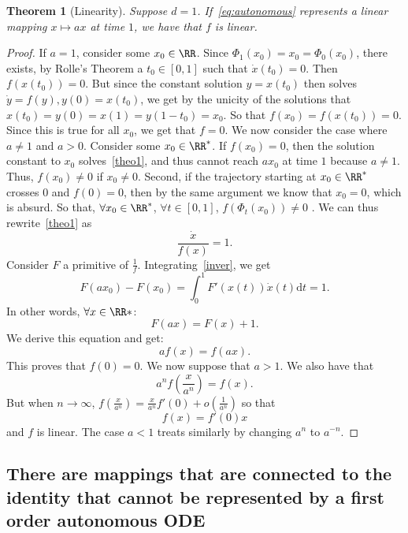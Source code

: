 \documentclass{article}
\newtheorem{theorem}{Theorem}
\begin{document}
\begin{theorem}[Linearity]\label{theo1}
Suppose $d=1$. If~\eqref{eq:autonomous} represents a linear mapping $x \mapsto ax$ at time $1$, we have that $f$ is linear.
\end{theorem}
\begin{proof}
If $a=1$, consider some $x_0 \in \RR$. Since $\Phi_1(x_0) = x_0 = \Phi_0(x_0)$, there exists, by Rolle's Theorem a $t_0 \in [0,1]$ such that $\dot{x}(t_0) = 0$. Then $f(x(t_0)) = 0$. But since the constant solution $y = x(t_0)$ then solves $\dot{y} = f(y), y(0)= x(t_0)$, we get by the unicity of the solutions that $x(t_0) = y(0) = x(1) = y(1-t_0) = x_0$. So that $f(x_0) = f(x(t_0)) = 0$. Since this is true for all $x_0$, we get that $f=0$. We now consider the case where $a \ne 1$ and $a > 0$.
Consider some $x_0 \in \RR^{*}$. If $f(x_0) = 0$, then the solution constant to $x_0$ solves~\eqref{theo1}, and thus cannot reach $ax_0$ at time $1$ because $a \neq 1$. Thus, $f(x_0) \ne 0$ if $x_0 \ne 0$. Second, if the trajectory starting at $x_0 \in \RR^{*}$ crosses $0$ and $f(0) = 0$, then by the same argument we know that $x_0 = 0$, which is absurd. So that, $\forall x_0 \in \RR^{*}$, $\forall t \in [0,1]$, $f(\Phi_t(x_0)) \ne 0$ .
We can thus rewrite~\eqref{theo1} as 
\begin{equation}\label{inver}
    \frac{\dot{x}}{f(x)} = 1.
\end{equation}
Consider $F$ a primitive of $\frac{1}{f}$.
Integrating~\eqref{inver}, we get
$$
F(ax_0) - F(x_0) = \int_{0}^{1} F'(x(t))\dot{x}(t)\mathrm{d} t = 1.
$$
In other words, $\forall x \in \RR*$:
$$
F(ax) = F(x) + 1.
$$
We derive this equation and get:
$$
af(x) = f(ax).
$$
This proves that $f(0) = 0$.
We now suppose that $a>1$.
We also have that 
$$
a^n f(\frac{x}{a^n}) =  f(x).
$$
But when $n \xrightarrow{} \infty$, $f(\frac{x}{a^n}) = \frac{x}{a^n}f'(0) + o(\frac{1}{a^n})$ so that 
$$
f(x) = f'(0)x
$$
and $f$ is linear.
The case $a < 1$ treats similarly by changing $a^n$ to $a^{-n}$.
\end{proof}




\subsection{There are mappings that are connected to the identity that cannot be represented by a first order autonomous ODE}
\end{document}
